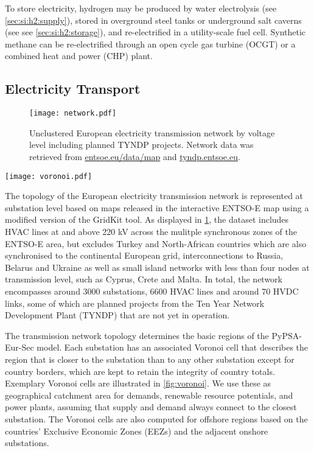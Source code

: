 To store electricity, hydrogen may be produced by water electrolysis (see
\cref{sec:si:h2:supply}), stored in overground steel tanks or underground salt
caverns (see see \cref{sec:si:h2:storage}), and re-electrified in a
utility-scale fuel cell. Synthetic methane can be re-electrified through an open
cycle gas turbine (OCGT) or a combined heat and power (CHP) plant.

\subsection{Electricity Transport}
\label{sec:si:electricity:transport}

\begin{figure}
    \texttt{[image: network.pdf]}
    \caption{Unclustered European electricity transmission network by voltage level including planned TYNDP projects. Network data was retrieved from \href{https://www.entsoe.eu/data/map/}{entsoe.eu/data/map} and \href{https://tyndp.entsoe.eu/}{tyndp.entsoe.eu}.}
    \label{fig:base-network}
\end{figure}

\begin{SCfigure}
    \caption{Exemplary Voronoi cells of the transmission network's substations.}
    \texttt{[image: voronoi.pdf]}
    \label{fig:voronoi}
\end{SCfigure}


The topology of the European electricity transmission network is represented at
substation level based on maps released in the interactive \mbox{ENTSO-E} map
using a modified version of the GridKit tool. As displayed in
\cref{fig:base-network}, the dataset includes HVAC lines at and above 220 kV
across the mulitple synchronous zones of the \mbox{ENTSO-E} area, but excludes Turkey
and North-African countries which are also synchronised to the continental
European grid, interconnections to Russia, Belarus and Ukraine as well as small
island networks with less than four nodes at transmission level, such as Cyprus,
Crete and Malta. In total, the network encompasses around 3000 substations, 6600
HVAC lines and around 70 HVDC links, some of which are planned projects from the
Ten Year Network Development Plant (TYNDP) that are not yet in operation.


The transmission network topology determines the basic regions of the
PyPSA-Eur-Sec model. Each substation has an associated Voronoi cell that
describes the region that is closer to the substation than to any other
substation except for country borders, which are kept to retain the integrity of
country totals. Exemplary Voronoi cells are illustrated in \cref{fig:voronoi}.
We use these as geographical catchment area for demands, renewable resource
potentials, and power plants, assuming that supply and demand always connect to
the closest substation. The Voronoi cells are also computed for offshore regions
based on the countries' Exclusive Economic Zones (EEZs) and the adjacent onshore
substations.

